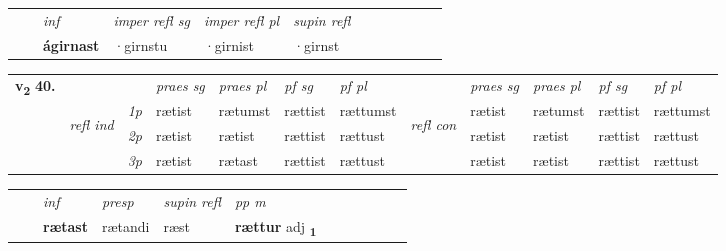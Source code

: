 \begin{tabular}{llllllllllll}
 & & \textit{inf}   & \textit{imper refl sg} & \textit{imper refl pl}   & \textit{supin refl}      \\*
  & & \textbf{ágirnast}    & ·girnstu & ·girnist   & ·girnst  \\*
\cmidrule{1-12}
\end{tabular}



\begin{tabular}{llllllllllll} \toprule
\multirow{4}{*}{{{\textbf{v{\textsubscript{2}}} \Large{\textbf{40.}}}}}  & &   &  \textit{praes sg}  & \textit{praes pl}  &\textit{pf sg} & \textit{pf pl} &  &  \textit{praes sg}  & \textit{praes pl}  & \textit{pf sg} & \textit{pf pl } \\*
	\cmidrule{4-7} \cmidrule{9-12}
 &\multirow{3}{*}{\begin{turn}{90}\textit{refl ind}\end{turn}} & {\textit{1p}} & rætist & rætumst    & rættist & rættumst & \multirow{3}{*}{\begin{turn}{90}\textit{refl con}\end{turn}}  &rætist & rætumst & rættist & rættumst\\*
 &&  {\textit{2p}} &  rætist  & rætist   & rættist & rættust & &rætist & rætist & rættist & rættust \\*
& &  {\textit{3p}} & rætist & rætast   & rættist & rættust & & rætist & rætist& rættist & rættust  \\*
\cmidrule{4-7} \cmidrule{9-12}
\end{tabular}


\begin{tabular}{llllllllllll}
 & & \textit{inf}     & \textit{presp}  & \textit{supin refl} & \textit{pp m}     \\*
  & & \textbf{rætast}      & rætandi  & ræst & \textbf{rættur} adj \textbf{\textsubscript{1}} \\*
\cmidrule{1-12}
\end{tabular}



